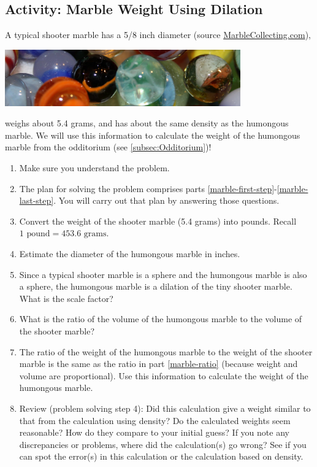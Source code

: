 \subsection{Activity: Marble Weight Using Dilation}
A typical shooter marble has a 5/8 inch diameter (source  \href{https://www.marblecollecting.com/marble-reference/how-to-size-marbles/}{MarbleCollecting.com}),
\begin{center}\includegraphics[width=4in]{images/marbles}\end{center}
weighs about 5.4 grams, and has about the same density as the humongous marble. We will use this information to calculate the weight of the humongous marble from the odditorium (see \ref{subsec:Odditorium})!
\begin{enumerate}
    \item Make sure you understand the problem.
    \item The plan for solving the problem comprises parts \ref{marble-first-step}-\ref{marble-last-step}. You will carry out that plan by answering those questions.
    \item \label{marble-first-step}Convert the weight of the shooter marble (5.4 grams) into pounds. Recall $1\text{ pound}=453.6\text{ grams}$.\wbvfill
    \item Estimate the diameter of the humongous marble in inches.\wbvfill
    \item Since a typical shooter marble is a sphere and the humongous marble is also a sphere, the humongous marble is a dilation of the tiny shooter marble. What is the scale factor?\wbvfill
    \wbnewpage
    \item \label{marble-ratio}What is the ratio of the volume of the humongous marble to the volume of the shooter marble?\wbvfill
    \item \label{marble-last-step}The ratio of the weight of the humongous marble to the weight of the shooter marble is the same as the ratio in part \ref{marble-ratio} (because weight and volume are proportional). Use this information to calculate the weight of the humongous marble.\wbvfill
    \item Review (problem solving step 4): Did this calculation give a weight similar to that from the calculation using density? Do the calculated weights seem reasonable? How do they compare to your initial guess? If you note any discrepancies or problems, where did the calculation(s) go wrong? See if you can spot the error(s) in this calculation or the calculation based on density.
    \wbvfill
\end{enumerate}

